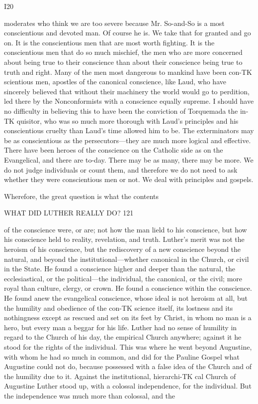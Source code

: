 \documentclass[12pt,a5paper,oneside]{book}
\begin{document}
I20 

moderates who think we are too severe because Mr. 
So-and-So is a most conscientious and devoted man. 
Of course he is. We take that for granted and go 
on. It is the conscientious men that are most worth 
fighting. It is the conscientious men that do so 
much mischief, the men who are more concerned 
about being true to their conscience than about their 
conscience being true to truth and right. Many of 
the men most dangerous to mankind have been con-TK
scientious men, apostles of the canonical conscience, 
like Laud, who have sincerely believed that without 
their machinery the world would go to perdition, 
led there by the Nonconformists with a conscience 
equally supreme. I should have no difficulty in believing 
this to have been the conviction of Torquemada the in-TK
quisitor, who was so much more thorough with Laud's 
principles and his conscientious cruelty than Laud's 
time allowed him to be. The exterminators may be as 
conscientious as the persecutors---they are much more 
logical and effective. There have been heroes of the 
conscience on the Catholic side as on the Evangelical, 
and there are to-day. There may be as many, there may 
be more. We do not judge individuals or count them, 
and therefore we do not need to ask whether they were 
conscientious men or not. We deal with principles 
and gospels. 

Wherefore, the great question is what the contents 



WHAT DID LUTHER REALLY DO? 121 

of the conscience were, or are; not how the man 
lield to his conscience, but how his conscience held to 
reality, revelation, and truth. Luther's merit was not 
the heroism of his conscience, but the rediscovery of 
a new conscience beyond the natural, and beyond the 
institutional---whether canonical in the Church, or civil 
in the State. He found a conscience higher and 
deeper than the natural, the ecclesiastical, or the 
political---the individual, the canonical, or the civil; 
more royal than culture, clergy, or crown. He found 
a conscience within the conscience. He found anew 
the evangelical conscience, whose ideal is not heroism 
at all, but the humility and obedience of the con-TK
science itself, its lostness and its nothingness except 
as rescued and set on its feet by Christ, in whom no 
man is a hero, but every man a beggar for his life. 
Luther had no sense of humility in regard to the 
Church of his day, the empirical Church anywhere; 
against it he stood for the rights of the individual. 
This was where he went beyond Augustine, with 
whom he had so much in common, and did for the 
Pauline Gospel what Augustine could not do, because 
possessed with a false idea of the Church and of the 
humility due to it. Against the institutional, hierarchi-TK
cal Church of Augustine Luther stood up, with a 
colossal independence, for the individual. But the 
independence was much more than colossal, and the 
\end{document}
